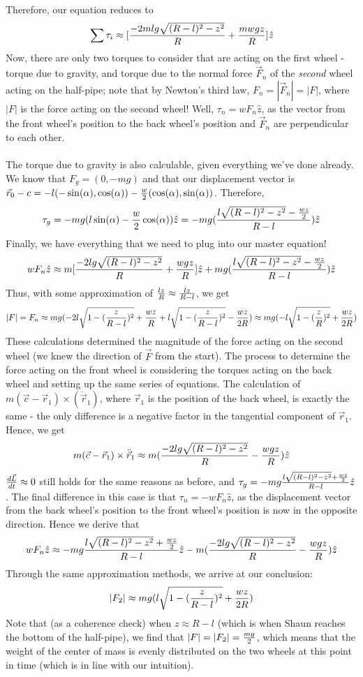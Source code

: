 Therefore, our equation reduces to
$$\sum \tau_i\approx [\frac{-2mlg\sqrt{(R-l)^2-z^2}}{R}+\frac{mwgz}{R}]\hat z$$
Now, there are only two torques to consider that are acting on the first wheel - torque due to gravity, and torque due to the normal force $\vec F_n$ of the \textit{second} wheel acting on the half-pipe; note that by Newton's third law, $F_n=|\vec F_n|=|F|$, where $|F|$ is the force acting on the second wheel!  Well, $\tau_n=w F_n \hat z$, as the vector from the front wheel's position to the back wheel's position and $\vec F_n$ are perpendicular to each other.   
\\\\ The torque due to gravity is also calculable, given everything we've done already.  We know that $F_g=(0, -mg)$ and that our displacement vector is $\vec r_0-c=-l(-\sin(\alpha), \cos(\alpha))-\frac w 2(\cos(\alpha), \sin(\alpha))$.  Therefore, 
$$\tau_g=-mg(l\sin(\alpha)-\frac w 2 \cos(\alpha))\hat z=-mg(\frac{l\sqrt{(R-l)^2-z^2}-\frac {wz}{2}}{R-l})\hat z$$
Finally, we have everything that we need to plug into our master equation!
$$w F_n \hat z\approx  m[\frac{-2lg\sqrt{(R-l)^2-z^2}}{R}+\frac{wgz}{R}]\hat z+mg(\frac{l\sqrt{(R-l)^2-z^2}-\frac {wz}{2}}{R-l})\hat z$$
Thus, with some approximation of $\frac {lz} R\approx \frac {lz}{R-l}$, we get
$$|F|=F_n\approx mg(-2l\sqrt{1-(\frac z {R-l})^2}+ \frac {wz}{R}+l\sqrt{1-(\frac z {R-l})^2}-\frac {wz}{2R})\approx mg(-l\sqrt{1-(\frac z R)^2}+\frac{wz}{2R})$$
These calculations determined the magnitude of the force acting on the second wheel (we knew the direction of $\vec F$ from the start).  The process to determine the force acting on the front wheel is considering the torques acting on the back wheel and setting up the same series of equations.  The calculation of $m(\vec c - \vec r_1)\times (\ddot {\vec r}_1)$, where $\vec r_1$ is the position of the back wheel, is exactly the same - the only difference is a negative factor in the tangential component of $\vec r_1$.  Hence, we get
$$m(\vec c-\vec r_1)\times \ddot{\vec r}_1\approx m(\frac{-2lg\sqrt{(R-l)^2-z^2}}{R}-\frac {wgz}R)\hat z$$
$\frac{d\vec L}{dt}\approx 0$ still holds for the same reasons as before, and $\tau_g=-mg\frac{l\sqrt{(R-l)^2-z^2}+\frac {wz}2}{R-l} \hat z$.  The final difference in this case is that $\tau_n=-wF_n \hat z$, as the displacement vector from the back wheel's position to the front wheel's position is now in the opposite direction.  Hence we derive that
$$w F_n \hat z\approx -mg\frac{l\sqrt{(R-l)^2-z^2}+\frac {wz}2}{R-l} \hat z-m(\frac{-2lg\sqrt{(R-l)^2-z^2}}{R}-\frac {wgz}R)\hat z$$
Through the same approximation methods, we arrive at our conclusion:
$$|F_2|\approx mg(l\sqrt{1-(\frac z {R-l})^2}+\frac{wz}{2R})$$
Note that (as a coherence check) when $z\approx R-l$ (which is when Shaun reaches the bottom of the half-pipe), we find that $|F|=|F_2|=\frac {mg}2$, which means that the weight of the center of mass is evenly distributed on the two wheels at this point in time (which is in line with our intuition).  

